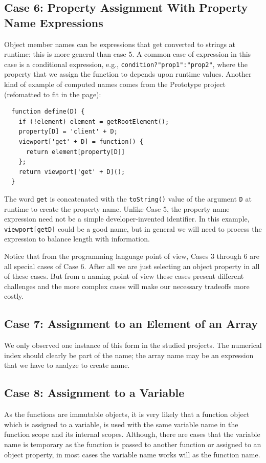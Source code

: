 \documentclass[10pt, preprint]{sigplanconf}
\begin{document}
\subsection{Case 6:  Property Assignment With  Property Name Expressions}
Object member names can be expressions that get converted to strings at runtime: this is more general than case 5. 
 A common case of expression in this case is a conditional expression, e.g., {\small\texttt{condition?"prop1":"prop2"}}, where the property that we assign the function to depends upon runtime values. Another kind of example of computed names comes from the Prototype project (refomatted to fit in the page):
\begin{verbatim}
  function define(D) {
    if (!element) element = getRootElement();
    property[D] = 'client' + D;
    viewport['get' + D] = function() { 
      return element[property[D]] 
    };
    return viewport['get' + D]();
  }
\end{verbatim}
The word \verb|get| is concatenated with the \verb|toString()| value of the argument \verb|D| at runtime to create the property name.  Unlike Case 5, the property name expression need not be a simple developer-invented identifier. In this example, \verb|viewport[getD]| could be a good name, but in general we will need to process the expression to balance length with information.

Notice that from the programming language point of view, Cases 3 through 6 are all special cases of Case 6. After all we are just selecting an object property in all of these cases.  But from a naming point of view these cases present different challenges and the more complex cases will make our necessary tradeoffs more costly.

\subsection{Case 7: Assignment to an Element of an Array}
We only observed one instance of this form in the studied projects. The numerical index should clearly be part of the name; the array name may be an expression that we have to analyze to create name.

\subsection{Case 8: Assignment to a Variable }
As the functions are immutable objects, it is very likely that a function object which is assigned to a variable, is used with the same variable name in the function scope
and its internal scopes. Although, there are cases that the variable name is temporary as the function is passed to another function or assigned to an object property, in most cases the variable name works will as the function name. 
\end{document}
